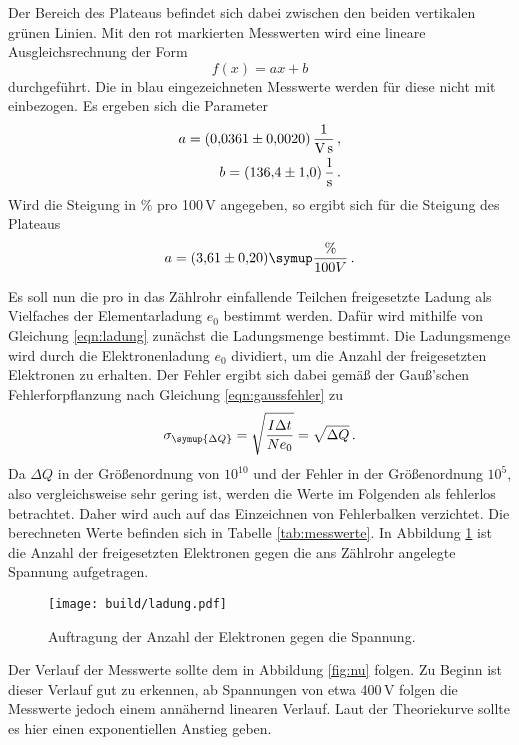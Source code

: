 Der Bereich des Plateaus befindet sich dabei zwischen den
beiden vertikalen grünen Linien. Mit den rot markierten Messwerten wird eine lineare
Ausgleichsrechnung der Form
\begin{equation}
  f(x)=ax+b
\end{equation}
durchgeführt. Die in blau eingezeichneten Messwerte werden für diese nicht mit
einbezogen. Es ergeben sich die Parameter
\begin{align*}
  a = (0{,}0361 \pm 0{,}0020)\, \frac{1}{\text{V\,s}} \,,\\
  b = (136{,}4 \pm 1{,}0)\,\frac{1}{\text{s}} \,.
\end{align*}
Wird die Steigung in $\%$ pro 100\,V angegeben, so ergibt sich für die Steigung des
Plateaus
\begin{equation*}
  a=(3{,}61 \pm 0{,}20) \symup{\frac{\%}{100V}} \,.  %
\end{equation*}





Es soll nun die pro in das Zählrohr einfallende Teilchen freigesetzte Ladung
als Vielfaches der Elementarladung $e_0$ bestimmt werden. Dafür wird mithilfe von
Gleichung \eqref{eqn:ladung} zunächst die Ladungsmenge bestimmt. Die Ladungsmenge wird durch die
Elektronenladung $e_0$ dividiert, um die Anzahl der freigesetzten Elektronen
zu erhalten. Der Fehler ergibt sich dabei
gemäß der Gauß'schen Fehlerforpflanzung nach Gleichung \eqref{eqn:gaussfehler} zu
\begin{equation*}
  \sigma_{\symup{\Delta Q}}=\sqrt{\frac{I \Delta t}{N e_0}}=\sqrt{\Delta Q} \,.
\end{equation*}
Da $\Delta Q$ in der Größenordnung von $10^{10}$ und der Fehler in der
Größenordnung $10^{5}$, also vergleichsweise sehr gering ist, werden die
Werte im Folgenden als fehlerlos betrachtet. Daher wird auch auf das Einzeichnen von
Fehlerbalken verzichtet. Die berechneten Werte
befinden sich in Tabelle \ref{tab:messwerte}.
In Abbildung \ref{fig:ladung} ist die Anzahl der freigesetzten Elektronen
gegen die ans Zählrohr angelegte Spannung aufgetragen.

\begin{figure}
  \centering
  \texttt{[image: build/ladung.pdf]}
  \caption{Auftragung der Anzahl der Elektronen gegen die Spannung.}
  \label{fig:ladung}
\end{figure}

Der Verlauf der Messwerte sollte dem in Abbildung \ref{fig:nu} folgen. Zu Beginn ist
dieser Verlauf gut zu erkennen, ab Spannungen von etwa 400\,V folgen die Messwerte
jedoch einem annähernd linearen Verlauf. Laut der Theoriekurve sollte es hier
einen exponentiellen Anstieg geben.

